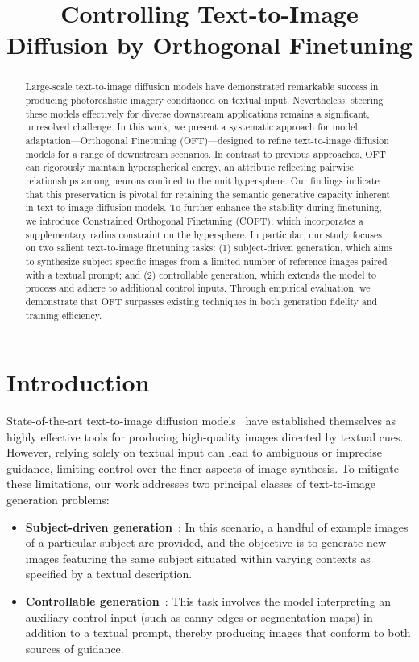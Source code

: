 \title{Controlling Text-to-Image Diffusion by Orthogonal Finetuning}

\begin{abstract}
Large-scale text-to-image diffusion models have demonstrated remarkable success in producing photorealistic imagery conditioned on textual input. Nevertheless, steering these models effectively for diverse downstream applications remains a significant, unresolved challenge. In this work, we present a systematic approach for model adaptation—Orthogonal Finetuning (OFT)—designed to refine text-to-image diffusion models for a range of downstream scenarios. In contrast to previous approaches, OFT can rigorously maintain hyperspherical energy, an attribute reflecting pairwise relationships among neurons confined to the unit hypersphere. Our findings indicate that this preservation is pivotal for retaining the semantic generative capacity inherent in text-to-image diffusion models. To further enhance the stability during finetuning, we introduce Constrained Orthogonal Finetuning (COFT), which incorporates a supplementary radius constraint on the hypersphere. In particular, our study focuses on two salient text-to-image finetuning tasks: (1) subject-driven generation, which aims to synthesize subject-specific images from a limited number of reference images paired with a textual prompt; and (2) controllable generation, which extends the model to process and adhere to additional control inputs. Through empirical evaluation, we demonstrate that OFT surpasses existing techniques in both generation fidelity and training efficiency.
\end{abstract}

\section{Introduction}

State-of-the-art text-to-image diffusion models~\cite{saharia2022photorealistic,ramesh2022hierarchical,rombach2022high} have established themselves as highly effective tools for producing high-quality images directed by textual cues. However, relying solely on textual input can lead to ambiguous or imprecise guidance, limiting control over the finer aspects of image synthesis. To mitigate these limitations, our work addresses two principal classes of text-to-image generation problems:

\begin{itemize}[leftmargin=*,nosep]

    \item \textbf{Subject-driven generation}~\cite{ruiz2023dreambooth}: In this scenario, a handful of example images of a particular subject are provided, and the objective is to generate new images featuring the same subject situated within varying contexts as specified by a textual description.
    \item \textbf{Controllable generation}~\cite{zhang2023adding,mou2023t2i}: This task involves the model interpreting an auxiliary control input (such as canny edges or segmentation maps) in addition to a textual prompt, thereby producing images that conform to both sources of guidance.
\end{itemize}

